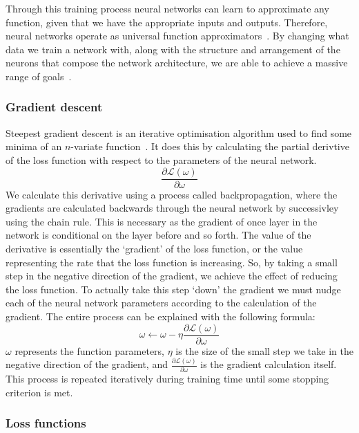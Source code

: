 Through this training process neural networks can learn to approximate any function, given that we have the appropriate inputs and outputs. Therefore, neural networks operate as universal function approximators~\cite{ref}. By changing what data we train a network with, along with the structure and arrangement of the neurons that compose the network architecture, we are able to achieve a massive range of goals~\cite{ref}.

\subsubsection{Gradient descent}\label{subsubsec:sgd}
Steepest gradient descent is an iterative optimisation algorithm used to find some minima of an $n$-variate function~\cite{ref}. It does this by calculating the partial derivtive of the loss function with respect to the parameters of the neural network.
\[\frac{\partial\mathcal{L}(\omega)}{\partial\omega}\]
We calculate this derivative using a process called backpropagation, where the gradients are calculated backwards through the neural network by successivley using the chain rule. This is necessary as the gradient of once layer in the network is conditional on the layer before and so forth. The value of the derivative is essentially the `gradient' of the loss function, or the value representing the rate that the loss function is increasing. So, by taking a small step in the negative direction of the gradient, we achieve the effect of reducing the loss function. To actually take this step `down' the gradient we must nudge each of the neural network parameters according to the calculation of the gradient. The entire process can be explained with the following formula:
\[\omega \leftarrow\omega - \eta\frac{\partial\mathcal{L}(\omega)}{\partial\omega}\]
$\omega$ represents the function parameters, $\eta$ is the size of the small step we take in the negative direction of the gradient, and $\frac{\partial\mathcal{L}(\omega)}{\partial\omega}$ is the gradient calculation itself. This process is repeated iteratively during training time until some stopping criterion is met.

\subsubsection{Loss functions}

